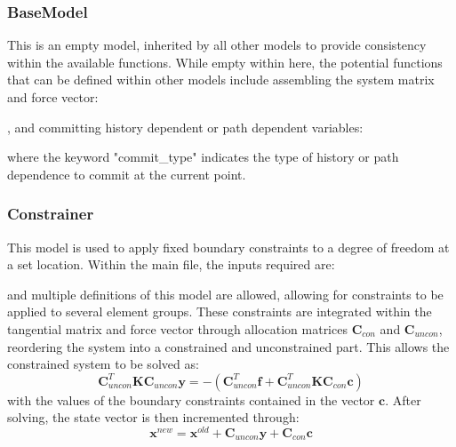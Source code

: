 \documentclass[3p]{elsarticle} %
\begin{document}
\subsubsection{BaseModel}
This is an empty model, inherited by all other models to provide consistency within the available functions. While empty within here, the potential functions that can be defined within other models include assembling the system matrix and force vector:

, and committing history dependent or path dependent variables:

where the keyword "commit{\_}type" indicates the type of history or path dependence to commit at the current point. 

\subsubsection{Constrainer}
This model is used to apply fixed boundary constraints to a degree of freedom at a set location. Within the main file, the inputs required are:

and multiple definitions of this model are allowed, allowing for constraints to be applied to several element groups. These constraints are integrated within the tangential matrix and force vector through  allocation matrices $\bm{C}_{con}$ and $\bm{C}_{uncon}$, reordering the system into a constrained and unconstrained part. This allows the constrained system to be solved as:
\begin{equation}
	\bm{C}_{uncon}^T \bm{K} \bm{C}_{uncon} \mathbf{y} = -\left(\bm{C}_{uncon}^T\bm{f}+\bm{C}_{uncon}^T \bm{K} \bm{C}_{con}\mathbf{c}\right)
\end{equation}
with the values of the boundary constraints contained in the vector $\mathbf{c}$. After solving, the state vector is then incremented through:
\begin{equation}
	\mathbf{x}^{new} = \mathbf{x}^{old} + \bm{C}_{uncon}\mathbf{y} + \bm{C}_{con}\mathbf{c}
\end{equation}
\end{document}
